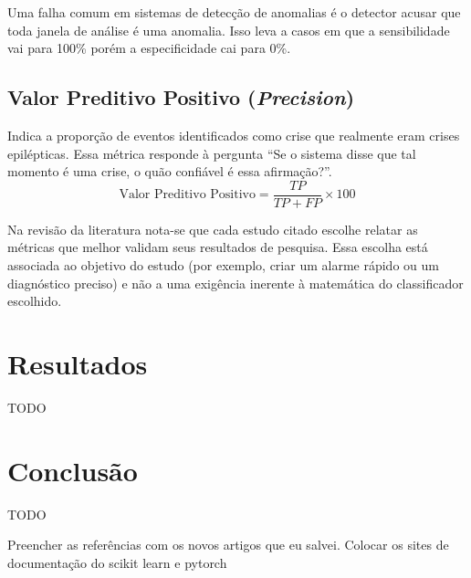 \documentclass[]{article}
\begin{document}
	Uma falha comum em sistemas de detecção de anomalias é o detector acusar que toda janela de análise é uma anomalia. Isso leva a casos em que a sensibilidade vai para 100\% porém a especificidade cai para 0\%.

	\subsection{Valor Preditivo Positivo (\textit{Precision})}
	\noindent
	Indica a proporção de eventos identificados como crise que realmente eram crises epilépticas. Essa métrica responde à pergunta ``Se o sistema disse que tal momento é uma crise, o quão confiável é essa afirmação?''.
	\begin{equation}
		\text{Valor Preditivo Positivo} = \frac{TP}{TP + FP} \times 100
	\end{equation}

	Na revisão da literatura nota-se que cada estudo citado escolhe relatar as métricas que melhor validam seus resultados de pesquisa. Essa escolha está associada ao objetivo do estudo (por exemplo, criar um alarme rápido ou um diagnóstico preciso) e não a uma exigência inerente à matemática do classificador escolhido.

	\section{Resultados}
	\label{sec:resultados}
	TODO
	\section{Conclusão}
	\label{sec:conclusao}
	TODO
	
	Preencher as referências com os novos artigos que eu salvei. Colocar os sites de documentação do scikit learn e pytorch
	
	\clearpage
	 
	
	
\end{document}
